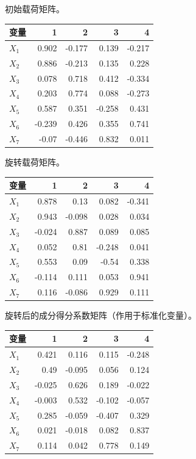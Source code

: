 初始载荷矩阵。

\begin{center}\small\setlength{\tabcolsep}{4pt}\renewcommand{\arraystretch}{1.18}\begin{tabular}{@{}lrrrr@{}}
\toprule
变量 & 1 & 2 & 3 & 4 \\
\midrule

\(X_1\) & 0.902 & -0.177 & 0.139 & -0.217 \\
\(X_2\) & 0.886 & -0.213 & 0.135 & 0.228 \\
\(X_3\) & 0.078 & 0.718 & 0.412 & -0.334 \\
\(X_4\) & 0.203 & 0.774 & 0.088 & -0.273 \\
\(X_5\) & 0.587 & 0.351 & -0.258 & 0.431 \\
\(X_6\) & -0.239 & 0.426 & 0.355 & 0.741 \\
\(X_7\) & -0.07 & -0.446 & 0.832 & 0.011 \\
\bottomrule\end{tabular}\end{center}

旋转载荷矩阵。

\begin{center}\small\setlength{\tabcolsep}{4pt}\renewcommand{\arraystretch}{1.18}\begin{tabular}{@{}lrrrr@{}}
\toprule
变量 & 1 & 2 & 3 & 4 \\
\midrule

\(X_1\) & 0.878 & 0.13 & 0.082 & -0.341 \\
\(X_2\) & 0.943 & -0.098 & 0.028 & 0.034 \\
\(X_3\) & -0.024 & 0.887 & 0.089 & 0.085 \\
\(X_4\) & 0.052 & 0.81 & -0.248 & 0.041 \\
\(X_5\) & 0.553 & 0.09 & -0.54 & 0.338 \\
\(X_6\) & -0.114 & 0.111 & 0.053 & 0.941 \\
\(X_7\) & 0.116 & -0.086 & 0.929 & 0.111 \\
\bottomrule\end{tabular}\end{center}

旋转后的成分得分系数矩阵（作用于标准化变量）。

\begin{center}\small\setlength{\tabcolsep}{4pt}\renewcommand{\arraystretch}{1.18}\begin{tabular}{@{}lrrrr@{}}
\toprule
变量 & 1 & 2 & 3 & 4 \\
\midrule

\(X_1\) & 0.421 & 0.116 & 0.115 & -0.248 \\
\(X_2\) & 0.49 & -0.095 & 0.056 & 0.124 \\
\(X_3\) & -0.025 & 0.626 & 0.189 & -0.022 \\
\(X_4\) & -0.003 & 0.532 & -0.102 & -0.057 \\
\(X_5\) & 0.285 & -0.059 & -0.407 & 0.329 \\
\(X_6\) & 0.021 & -0.018 & 0.082 & 0.837 \\
\(X_7\) & 0.114 & 0.042 & 0.778 & 0.149 \\
\bottomrule\end{tabular}\end{center}


